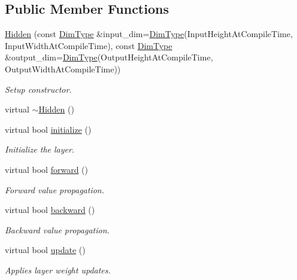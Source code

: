 \subsection*{Public Member Functions}
\begin{DoxyCompactItemize}
\item 
\hyperlink{classffnn_1_1layer_1_1_hidden_ade54de529e6aa7fd09b1ca61fea0ccc5}{Hidden} (const \hyperlink{classffnn_1_1layer_1_1_hidden_aba8b203c8b193a53d19fc26c10b14872}{Dim\-Type} \&input\-\_\-dim=\hyperlink{classffnn_1_1layer_1_1_hidden_aba8b203c8b193a53d19fc26c10b14872}{Dim\-Type}(Input\-Height\-At\-Compile\-Time, Input\-Width\-At\-Compile\-Time), const \hyperlink{classffnn_1_1layer_1_1_hidden_aba8b203c8b193a53d19fc26c10b14872}{Dim\-Type} \&output\-\_\-dim=\hyperlink{classffnn_1_1layer_1_1_hidden_aba8b203c8b193a53d19fc26c10b14872}{Dim\-Type}(Output\-Height\-At\-Compile\-Time, Output\-Width\-At\-Compile\-Time))
\begin{DoxyCompactList}\small\item\em Setup constructor. \end{DoxyCompactList}\item 
virtual \hyperlink{classffnn_1_1layer_1_1_hidden_a28d2c1175388ed7e9126b7e0ddd45e14}{$\sim$\-Hidden} ()
\item 
virtual bool \hyperlink{classffnn_1_1layer_1_1_hidden_a3b5458a771fcf2371376049d85afbc92}{initialize} ()
\begin{DoxyCompactList}\small\item\em Initialize the layer. \end{DoxyCompactList}\item 
virtual bool \hyperlink{classffnn_1_1layer_1_1_hidden_aed780b7869487b020c839e5a3ce1d8e6}{forward} ()
\begin{DoxyCompactList}\small\item\em Forward value propagation. \end{DoxyCompactList}\item 
virtual bool \hyperlink{classffnn_1_1layer_1_1_hidden_a939fc9f0c269e63220305d787fbe600c}{backward} ()
\begin{DoxyCompactList}\small\item\em Backward value propagation. \end{DoxyCompactList}\item 
virtual bool \hyperlink{classffnn_1_1layer_1_1_hidden_a63913f14b69485eb0c21e02c09f735d4}{update} ()
\begin{DoxyCompactList}\small\item\em Applies layer weight updates. \end{DoxyCompactList}\end{DoxyCompactItemize}
